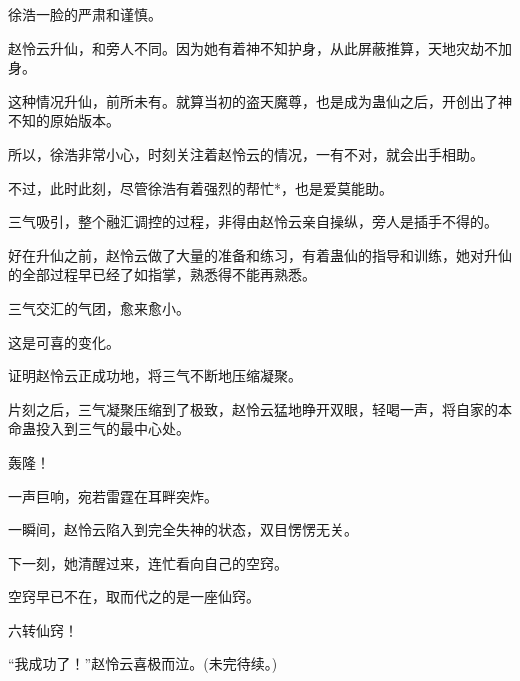 \begin{this_body}
徐浩一脸的严肃和谨慎。

赵怜云升仙，和旁人不同。因为她有着神不知护身，从此屏蔽推算，天地灾劫不加身。

这种情况升仙，前所未有。就算当初的盗天魔尊，也是成为蛊仙之后，开创出了神不知的原始版本。

所以，徐浩非常小心，时刻关注着赵怜云的情况，一有不对，就会出手相助。

不过，此时此刻，尽管徐浩有着强烈的帮忙*，也是爱莫能助。

三气吸引，整个融汇调控的过程，非得由赵怜云亲自操纵，旁人是插手不得的。

好在升仙之前，赵怜云做了大量的准备和练习，有着蛊仙的指导和训练，她对升仙的全部过程早已经了如指掌，熟悉得不能再熟悉。

三气交汇的气团，愈来愈小。

这是可喜的变化。

证明赵怜云正成功地，将三气不断地压缩凝聚。

片刻之后，三气凝聚压缩到了极致，赵怜云猛地睁开双眼，轻喝一声，将自家的本命蛊投入到三气的最中心处。

轰隆！

一声巨响，宛若雷霆在耳畔突炸。

一瞬间，赵怜云陷入到完全失神的状态，双目愣愣无关。

下一刻，她清醒过来，连忙看向自己的空窍。

空窍早已不在，取而代之的是一座仙窍。

六转仙窍！

“我成功了！”赵怜云喜极而泣。(未完待续。)

\end{this_body}

